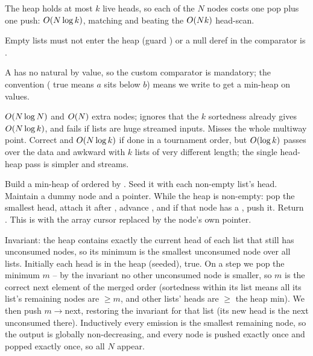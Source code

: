 \begin{observation}
The heap holds at most $k$ live heads, so each of the $N$ nodes costs one pop plus one push: $O(N\log k)$,
matching  and beating the $O(Nk)$ head-scan.
\end{observation}
\begin{observation}
Empty lists must not enter the heap (guard ) or a null deref in the comparator is \re.
\end{observation}
\begin{observation}
A  has no natural  by value, so the custom comparator is mandatory; the
 convention ( true means $a$ sits below $b$) means we write
 to get a min-heap on values.
\end{observation}

\begin{thinkbox}
{$O(N\log N)$ and $O(N)$ extra nodes; ignores that the $k$ sortedness already gives
$O(N\log k)$, and fails if lists are huge streamed inputs. Misses the whole multiway point.}
{Correct and $O(N\log k)$ if done in a tournament order, but $O(\log k)$ passes over the data and
awkward with $k$ lists of very different length; the single head-heap pass is simpler and streams.}
\end{thinkbox}

Build a min-heap of  ordered by . Seed it with each non-empty list's head.
Maintain a dummy node and a  pointer. While the heap is non-empty: pop the smallest head, attach it
after , advance , and if that node has a , push it. Return
. This is  with the array cursor  replaced by the node's
own  pointer.

\begin{proofbox}
Invariant: the heap contains exactly the current head of each list that still has unconsumed nodes, so its
minimum is the smallest unconsumed node over all lists. Initially each head is in the heap (seeded), true. On
a step we pop the minimum $m$ -- by the invariant no other unconsumed node is smaller, so $m$ is the correct
next element of the merged order (sortedness within its list means all its list's remaining nodes are
$\ge m$, and other lists' heads are $\ge$ the heap min). We then push $m\to$next, restoring the invariant for
that list (its new head is the next unconsumed there). Inductively every emission is the smallest remaining
node, so the output is globally non-decreasing, and every node is pushed exactly once and popped exactly once,
so all $N$ appear. \end{proofbox}

